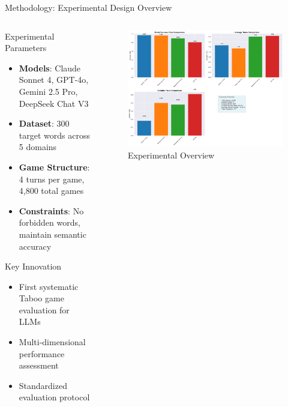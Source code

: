 \documentclass[aspectratio=169]{beamer}
\begin{document}
\begin{frame}{Methodology: Experimental Design Overview}
\begin{columns}[c]
\begin{column}{0.5\textwidth}
\begin{block}{Experimental Parameters}
\begin{itemize}
    \item \textbf{Models}: Claude Sonnet 4, GPT-4o, Gemini 2.5 Pro, DeepSeek Chat V3
    \item \textbf{Dataset}: 300 target words across 5 domains
    \item \textbf{Game Structure}: 4 turns per game, 4,800 total games
    \item \textbf{Constraints}: No forbidden words, maintain semantic accuracy
\end{itemize}
\end{block}

\begin{block}{Key Innovation}
\begin{itemize}
    \item First systematic Taboo game evaluation for LLMs
    \item Multi-dimensional performance assessment
    \item Standardized evaluation protocol
\end{itemize}
\end{block}
\end{column}

\begin{column}{0.48\textwidth}
\begin{figure}
\includegraphics[width=\textwidth]{comprehensive_figures/figure1_overview.png}
\caption{Experimental Overview}
\end{figure}
\end{column}
\end{columns}
\end{frame}
\end{document}
